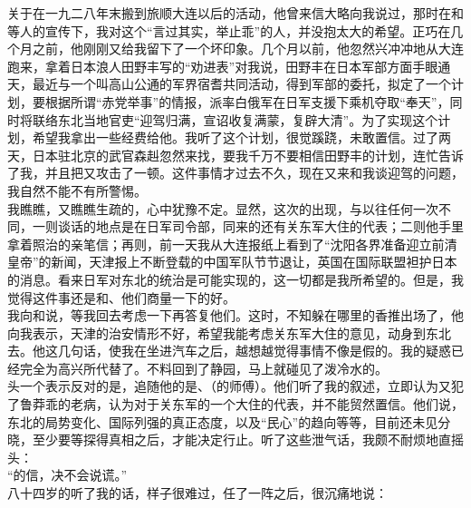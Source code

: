 关于在一九二八年末搬到旅顺大连以后的活动，他曾来信大略向我说过，那时在和等人的宣传下，我对这个“言过其实，举止乖”的人，并没抱太大的希望。正巧在几个月之前，他刚刚又给我留下了一个坏印象。几个月以前，他忽然兴冲冲地从大连跑来，拿着日本浪人田野丰写的“劝进表”对我说，田野丰在日本军部方面手眼通天，最近与一个叫高山公通的军界宿耆共同活动，得到军部的委托，拟定了一个计划，要根据所谓“赤党举事”的情报，派率白俄军在日军支援下乘机夺取“奉天”，同时将联络东北当地官吏“迎驾归满，宣诏收复满蒙，复辟大清”。为了实现这个计划，希望我拿出一些经费给他。我听了这个计划，很觉蹊跷，未敢置信。过了两天，日本驻北京的武官森赳忽然来找，要我千万不要相信田野丰的计划，连忙告诉了我，并且把又攻击了一顿。这件事情才过去不久，现在又来和我谈迎驾的问题，我自然不能不有所警惕。\\

我瞧瞧，又瞧瞧生疏的，心中犹豫不定。显然，这次的出现，与以往任何一次不同，一则谈话的地点是在日军司令部，同来的还有关东军大住的代表；二则他手里拿着照治的亲笔信；再则，前一天我从大连报纸上看到了“沈阳各界准备迎立前清皇帝”的新闻，天津报上不断登载的中国军队节节退让，英国在国际联盟袒护日本的消息。看来日军对东北的统治是可能实现的，这一切都是我所希望的。但是，我觉得这件事还是和、他们商量一下的好。\\

我向和说，等我回去考虑一下再答复他们。这时，不知躲在哪里的香推出场了，他向我表示，天津的治安情形不好，希望我能考虑关东军大住的意见，动身到东北去。他这几句话，使我在坐进汽车之后，越想越觉得事情不像是假的。我的疑惑已经完全为高兴所代替了。不料回到了静园，马上就碰见了泼冷水的。\\

头一个表示反对的是，追随他的是、（的师傅）。他们听了我的叙述，立即认为又犯了鲁莽乖的老病，认为对于关东军的一个大住的代表，并不能贸然置信。他们说，东北的局势变化、国际列强的真正态度，以及“民心”的趋向等等，目前还未见分晓，至少要等探得真相之后，才能决定行止。听了这些泄气话，我颇不耐烦地直摇头：\\

“的信，决不会说谎。”\\

八十四岁的听了我的话，样子很难过，任了一阵之后，很沉痛地说：\\

